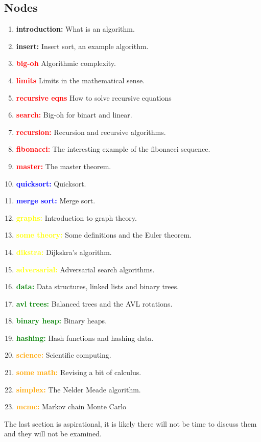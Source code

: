 \documentclass[11pt,a4paper]{scrartcl}
\begin{document}
\subsection*{Nodes}

\begin{enumerate}[label=(\alph*)]
\item \textbf{introduction:} What is an algorithm.
\item \textbf{insert:} Insert sort, an example algorithm.
\item \textbf{\textcolor{red}{big-oh}} Algorithmic complexity.
\item \textbf{\textcolor{red}{limits}} Limits in the mathematical sense.
\item \textbf{\textcolor{red}{recursive eqns}} How to solve recursive equations
\item \textbf{\textcolor{red}{search:}} Big-oh for binart and linear.
\item \textbf{\textcolor{red}{recursion:}} Recursion and recursive algorithms.
\item \textbf{\textcolor{red}{fibonacci:}} The interesting example of the fibonacci sequence. 
\item \textbf{\textcolor{red}{master:}} The master theorem.
\item \textbf{\textcolor{blue}{quicksort:}} Quicksort.
\item \textbf{\textcolor{blue}{merge sort:}} Merge sort.
\item \textbf{\textcolor{yellow}{graphs:}} Introduction to graph theory.
\item \textbf{\textcolor{yellow}{some theory:}} Some definitions and the Euler theorem. 
\item \textbf{\textcolor{yellow}{dikstra:}} Dijkskra's algorithm.
\item \textbf{\textcolor{yellow}{adversarial:}} Adversarial search algorithms.
\item \textbf{\textcolor{green}{data:}} Data structures, linked lists and binary trees.
\item \textbf{\textcolor{green}{avl trees:}} Balanced trees and the AVL rotations. 
\item \textbf{\textcolor{green}{binary heap:}} Binary heaps. 
\item \textbf{\textcolor{green}{hashing:}} Hash functions and hashing data. 
\item \textbf{\textcolor{orange}{science:}} Scientific computing.
\item \textbf{\textcolor{orange}{some math:}} Revising a bit of calculus.
\item \textbf{\textcolor{orange}{simplex:}} The Nelder Meade algorithm.
\item \textbf{\textcolor{orange}{mcmc:}} Markov chain Monte Carlo

\end{enumerate}

The last section is aspirational, it is likely there will not be time to discuss them and they will not be examined.
\end{document}
